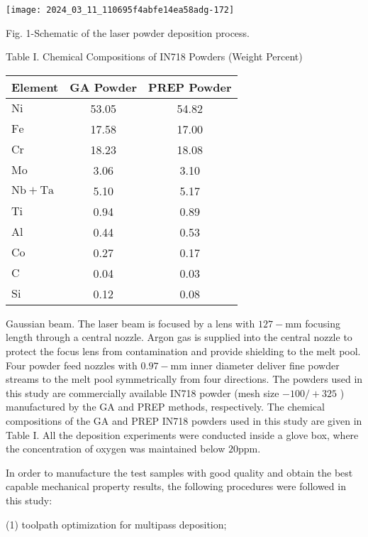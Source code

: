 \documentclass[10pt]{article}
\begin{document}
\begin{center}
\texttt{[image: 2024\_03\_11\_110695f4abfe14ea58adg-172]}
\end{center}

Fig. 1-Schematic of the laser powder deposition process.

Table I. Chemical Compositions of IN718 Powders (Weight Percent)

\begin{center}
\begin{tabular}{lcc}
\hline
Element & GA Powder & PREP Powder \\
\hline
$\mathrm{Ni}$ & 53.05 & 54.82 \\
$\mathrm{Fe}$ & 17.58 & 17.00 \\
$\mathrm{Cr}$ & 18.23 & 18.08 \\
$\mathrm{Mo}$ & 3.06 & 3.10 \\
$\mathrm{Nb}+\mathrm{Ta}$ & 5.10 & 5.17 \\
$\mathrm{Ti}$ & 0.94 & 0.89 \\
$\mathrm{Al}$ & 0.44 & 0.53 \\
$\mathrm{Co}$ & 0.27 & 0.17 \\
$\mathrm{C}$ & 0.04 & 0.03 \\
$\mathrm{Si}$ & 0.12 & 0.08 \\
\hline
\end{tabular}
\end{center}

Gaussian beam. The laser beam is focused by a lens with $127-\mathrm{mm}$ focusing length through a central nozzle. Argon gas is supplied into the central nozzle to protect the focus lens from contamination and provide shielding to the melt pool. Four powder feed nozzles with $0.97-\mathrm{mm}$ inner diameter deliver fine powder streams to the melt pool symmetrically from four directions. The powders used in this study are commercially available IN718 powder (mesh size $-100 /+325$ ) manufactured by the GA and PREP methods, respectively. The chemical compositions of the GA and PREP IN718 powders used in this study are given in Table I. All the deposition experiments were conducted inside a glove box, where the concentration of oxygen was maintained below $20 \mathrm{ppm}$.

In order to manufacture the test samples with good quality and obtain the best capable mechanical property results, the following procedures were followed in this study:

(1) toolpath optimization for multipass deposition;
\end{document}
